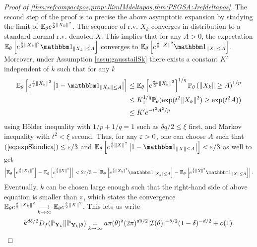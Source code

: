 \begin{proof}[Proof of \cref{thm:refcompactpos,prop:JlimIMdeltapos,thm:PSGSA:Jrefdeltapos}]
The second step of the proof is to precise the above asymptotic expansion by studying the limit of $\mathbb{E}_\theta e^{\frac{\delta}{2}\|X_k\|^2}$.
The sequence of r.v. $X_k$ converges in distribution to a standard normal r.v. denoted $X$. %
    This implies that for any $A>0$, the expectation $\EE_\theta\left[e^{\frac{\delta}{2}\|X_k\|^2}\indic_{\|X_k\|\leq A}\right]$ converges to $\EE_\theta\left[e^{\frac{\delta}{2}\|X\|^2}\indic_{\|X\|\leq A}\right]$. Moreover, under Assumption \ref{assu:gausstailSk} there exists a constant $K'$ independent of $k$ such that for any $k$
        \begin{align}\label{eq:expSkindica}
            \EE_\theta\left[ e^{\frac{\delta}{2}\|X_k\|^2}\left|1-\indic_{\|X_k\|\leq A}\right|\right] 
                & \leq \EE_\theta\left[e^{\frac{\delta q}{2}\|X_k\|^2}\right]^{1/q} \PP_\theta\left(\|X_k\|\geq A \right)^{1/p} \\
\nonumber            &\leq K_1^{1/q} \PP_\theta(\exp(t^2 \| X_k\|^2)\geq\exp(t^2A) )\\
\nonumber       & \leq K' e^{-t^2 A^2/p} 
        \end{align}
    using H\"older inequality with $1/p+1/q=1$ such as $\delta q/2\leq \xi $ first, and Markov inequality with $t^2<\xi$ second. Thus, for any $\varepsilon>0$, one can choose $A$ {such that $(\ref{eq:expSkindica}) \leq\varepsilon/3$ and $\EE_\theta\left[e^{\frac{\delta}{2}\|X\|^2}\left|1-\indic_{\|X\|\leq A}\right|\right]<\eps/3$ as well to get
    \begin{align}
       \left|\EE_\theta\left[e^{\frac{\delta}{2}\|X_k\|^2}\right] - \EE_\theta\left[e^{\frac{\delta}{2}\|X\|^2}\right]\right| 
     < 2\eps/3 + \left|\EE_\theta\left[e^{\frac{\delta}{2}\|X_k\|^2}\indic_{\|X_k\|\leq A}\right] - \EE_\theta\left[e^{\frac{\delta}{2}\|X\|^2}\indic_{\|X\|\leq A}\right]\right|.
    \end{align}
    Eventually, $k$ can be chosen large enough such that the right-hand side of above equation is smaller than $\varepsilon$, which states the convergence $\mathbb{E}_\theta e^{\frac{\delta}{2}\|X_k\|^2} \overset{\ }{\underset{k\rightarrow\infty}{\longrightarrow}} \mathbb{E}_\theta e^{\frac{\delta}{2}\|X\|^2}$.}
    This lets us write
    \begin{align}
        k^{d\delta/2} D_f(\mathbb{P}_{\mathbf{Y}_k} || \mathbb{P}_{\mathbf{Y}_k|\theta}) \overset{}{\underset{k\rightarrow\infty}{=}} a\pi(\theta)^\delta(2\pi)^{d\delta/2}|\mathcal{I}(\theta)|^{-\delta/2}(1-\delta)^{-d/2} + o(1).    
    \end{align}



\end{proof}
